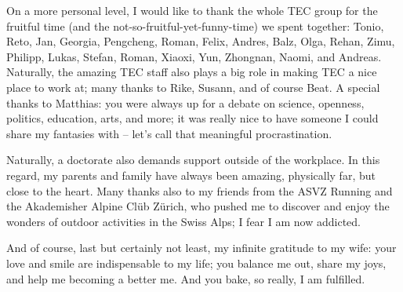 {\pagebreak

On a more personal level, I would like to thank the whole TEC group for the fruitful time (and the not-so-fruitful-yet-funny-time) we spent together: Tonio, Reto, Jan, Georgia, Pengcheng, Roman, Felix, Andres, Balz, Olga, Rehan, Zimu, Philipp, Lukas, Stefan, Roman, Xiaoxi, Yun, Zhongnan, Naomi, and Andreas.
Naturally, the amazing TEC staff also plays a big role in making TEC a nice place to work at; many thanks to Rike, Susann, and of course Beat.
A special thanks to Matthias: you were always up for a debate on science, openness, politics, education, arts, and more; it was really nice to have someone I could share my fantasies with -- let's call that meaningful procrastination.

Naturally, a doctorate also demands support outside of the workplace. In this regard, my parents and family have always been amazing, physically far, but close to the heart. Many thanks also to my friends from the ASVZ Running and the Akademisher Alpine Clüb Zürich, who pushed me to discover and enjoy the wonders of outdoor activities in the Swiss Alps; I fear I am now addicted.

And of course, last but certainly not least, my infinite gratitude to my wife: your love and smile are indispensable to my life; you balance me out, share my joys, and help me becoming a better me. And you bake, so really, I am fulfilled.

}
